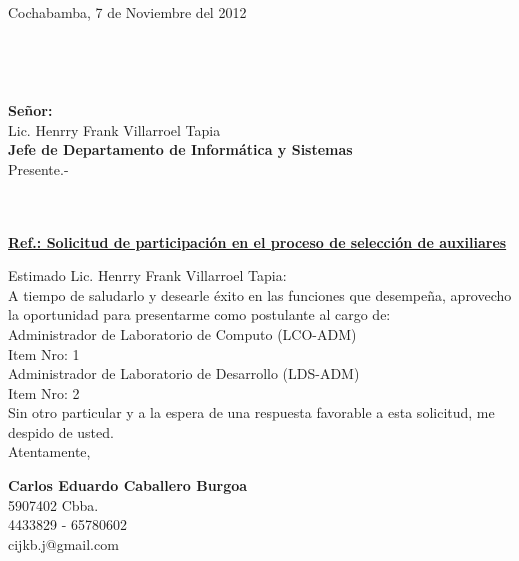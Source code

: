 \documentclass[letterpaper,11pt]{letter}
\begin{document}
Cochabamba, 7 de Noviembre del 2012\\
~\\
~\\
~\\
~\\
 \textbf{Señor:}~\\
Lic. Henrry Frank Villarroel Tapia~\\
 \textbf{Jefe de Departamento de Informática y Sistemas}~\\
Presente.-\\
~\\
~\\
\begin{center}
\underline{ \textbf{Ref.: Solicitud de participación en el proceso de selección de auxiliares}}
\end{center}
Estimado Lic. Henrry Frank Villarroel Tapia:\\
A tiempo de saludarlo y desearle éxito en las funciones que desempeña, aprovecho la oportunidad para presentarme como postulante al cargo de:\\
Administrador de Laboratorio de Computo (LCO-ADM)~\\
Item Nro: 1\\
Administrador de Laboratorio de Desarrollo (LDS-ADM)~\\
Item Nro: 2\\
Sin otro particular y a la espera de una respuesta favorable a esta solicitud, me despido de usted.\\
Atentamente,\\

\vspace{3.5cm}
\begin{center}
\begin{minipage}[b]{0.5\textwidth}
\begin{center}
{\bf Carlos Eduardo Caballero Burgoa}\\
5907402 Cbba.\\
4433829 - 65780602\\
cijkb.j@gmail.com\\
\end{center}
\end{minipage}
\end{center}
\newpage
\end{document}
